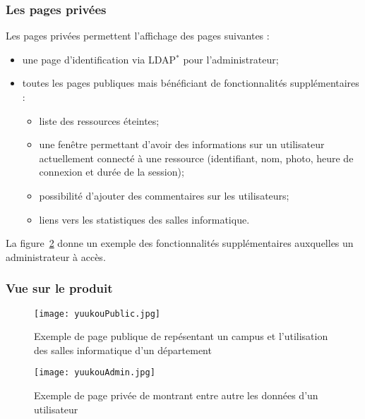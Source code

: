 \subsubsection{Les pages priv\'ees}

\noindent Les pages priv\'ees permettent l'affichage des pages suivantes :
\begin{itemize}
	\item une page d'identification via LDAP$^*$ pour l'administrateur;
	\item toutes les pages publiques mais b\'en\'eficiant de fonctionnalit\'es suppl\'ementaires :
	\begin{itemize}
		\item liste des ressources \'eteintes;
		\item une fen\^etre permettant d'avoir des informations sur un utilisateur actuellement connect\'e \`a une ressource (identifiant, nom, photo, heure de connexion et dur\'ee de la session);
		\item possibilit\'e d'ajouter des commentaires sur les utilisateurs;
		\item liens vers les statistiques des salles informatique.

	\end{itemize}

\end{itemize}

La figure~\ref{yuukouAdmin} donne un exemple des fonctionnalit\'es suppl\'ementaires auxquelles un administrateur \`a acc\`es.

\clearpage

\subsubsection{Vue sur le produit}

\begin{figure}[!ht]
	\centering
	\texttt{[image: yuukouPublic.jpg]}
	\caption{Exemple de page publique de \Yuukou{} rep\'esentant un campus et l'utilisation des salles informatique d'un d\'epartement}
	\label{yuukouPublic}

\end{figure}

\begin{figure}[!ht]
	\centering
	\texttt{[image: yuukouAdmin.jpg]}
	\caption{Exemple de page priv\'ee de \Yuukou{} montrant entre autre les donn\'ees d'un utilisateur}
	\label{yuukouAdmin}

\end{figure}

